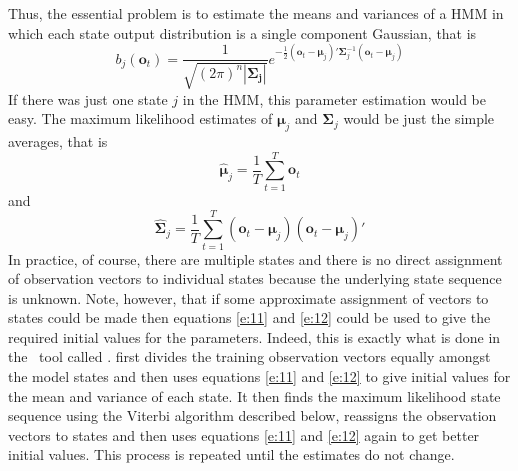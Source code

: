 
Thus, the essential problem is to estimate the means and 
variances of a HMM in which each state output distribution is a single
component Gaussian, that is
\begin{equation} \label{e:10}
b_j(\bm{o}_t) = \frac{1}{\sqrt{(2 \pi)^n | \bm{\Sigma_j} |}} 
      e^{- \frac{1}{2}(\bm{o}_t - \bm{\mu}_j)'\bm{\Sigma}_j^{-1}(\bm{o}_t - \bm{\mu}_j)}
\end{equation}
If there was just one state $j$ in the HMM, this parameter
estimation would be easy.  The maximum likelihood estimates of 
$\bm{\mu}_j$ and $\bm{\Sigma}_j$ would be just the simple averages, 
that is
\begin{equation} \label{e:11}
   \hat{\bm{\mu}}_j = \frac{1}{T} \sum_{t=1}^{T} \bm{o}_t
\end{equation}
and
\begin{equation} \label{e:12}
   \hat{\bm{\Sigma}}_j = \frac{1}{T} \sum_{t=1}^{T} 
        (\bm{o}_t - \bm{\mu}_j) (\bm{o}_t - \bm{\mu}_j)'
\end{equation}
In practice, of course, there are multiple states and there is no
direct assignment of observation vectors to individual states 
because the underlying state sequence is unknown.  Note, however,
that if some approximate assignment of vectors to states could be made then
equations \ref{e:11} and \ref{e:12} could be used to give the
required initial values for the parameters.  Indeed, this is exactly
what is done in the \HTK\ tool called .  
 first divides the
training observation vectors equally amongst the model states and then
uses equations \ref{e:11} and \ref{e:12} to give initial values for
the mean and variance of each state.  It then finds the maximum
likelihood state sequence using the Viterbi 
algorithm described  below,
reassigns the observation vectors to states and then uses
equations \ref{e:11} and \ref{e:12} again to get better initial 
values.  This process is repeated until the estimates
do not change.


